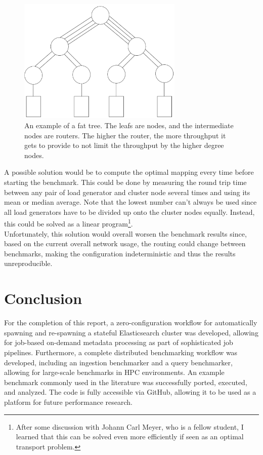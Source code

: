 \begin{figure}[H]
  \centering
  \includegraphics[width=0.7\textwidth]{./assets/fattree.png}
  \caption{An example of a fat tree. The leafs are nodes, and the intermediate nodes are routers. The higher the router, the more throughput it gets to provide to not limit the throughput by the higher degree nodes.}
\end{figure}


A possible solution would be to compute the optimal mapping every time before starting the benchmark. This could be done by measuring the round trip time between any pair of load generator and cluster node several times and using its mean or median average. Note that the lowest number can't always be used since all load generators have to be divided up onto the cluster nodes equally. Instead, this could be solved as a linear program\footnote{After some discussion with Johann Carl Meyer, who is a fellow student, I learned that this can be solved even more efficiently if seen as an optimal transport problem.}.\\

Unfortunately, this solution would overall worsen the benchmark results since, based on the current overall network usage, the routing could change between benchmarks, making the configuration indeterministic and thus the results unreproducible.

\section{Conclusion}
For the completion of this report, a zero-configuration workflow for automatically spawning and re-spawning a stateful Elasticsearch cluster was developed, allowing for job-based on-demand metadata processing as part of sophisticated job pipelines. Furthermore, a complete distributed benchmarking workflow was developed, including an ingestion benchmarker and a query benchmarker, allowing for large-scale benchmarks in \ac{HPC} environments. An example benchmark commonly used in the literature was successfully ported, executed, and analyzed. The code is fully accessible via GitHub, allowing it to be used as a platform for future performance research.

